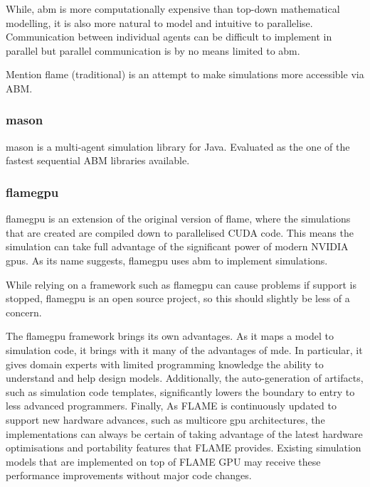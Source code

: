 \documentclass{UoYCSproject}
\begin{document}
While, \acrlong{abm} is more computationally expensive than top-down mathematical modelling, it is also more natural to model and intuitive to parallelise\cite{flame_simulation}.
Communication between individual agents can be difficult to implement in parallel but parallel communication is by no means limited to \acrshort{abm}.


Mention \acrshort{flame} (traditional) is an attempt to make simulations more accessible via ABM.


\subsubsection{\acrshort{mason}}
\acrshort{mason} is a multi-agent simulation library for Java.
Evaluated as the one of the fastest sequential ABM libraries available\cite{abm_platforms_review}.



\subsubsection{\acrshort{flamegpu}}
\acrfull{flamegpu} is an extension of the original version of \acrshort{flame}, where the simulations that are created are compiled down to parallelised CUDA code. This means the simulation can take full advantage of the significant power of modern NVIDIA \acrshort{gpu}s.
As its name suggests, \acrshort{flamegpu} uses \acrlong{abm} to implement simulations.

While relying on a framework such as \acrshort{flamegpu} can cause problems if support is stopped, \acrshort{flamegpu} is an open source project, so this should slightly be less of a concern.

The \acrshort{flamegpu} framework brings its own advantages.
As it maps a model to simulation code, it brings with it many of the advantages of \acrlong{mde}.
In particular, it gives domain experts with limited programming knowledge the ability to understand and help design models.
Additionally, the auto-generation of artifacts, such as simulation code templates, significantly lowers the boundary to entry to less advanced programmers.
Finally, As FLAME is continuously updated to support new hardware advances, such as multicore \acrshort{gpu} architectures\cite{flame_simulation}, the implementations can always be certain of taking advantage of the latest hardware optimisations and portability features that FLAME provides. Existing simulation models that are implemented on top of FLAME GPU may receive these performance improvements without major code changes.
\end{document}
